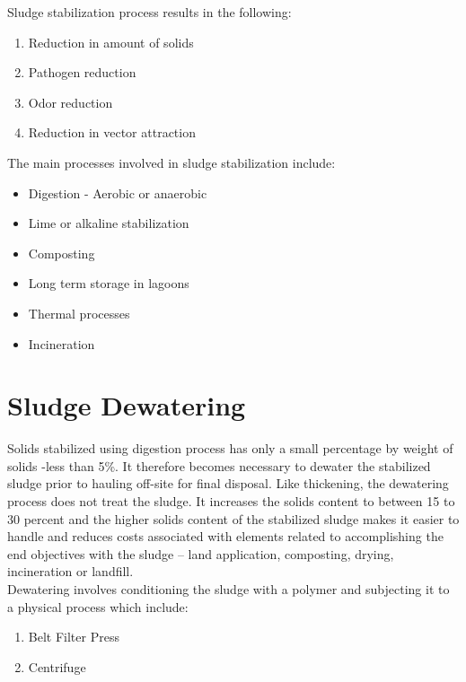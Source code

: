 Sludge stabilization process results in the following:
\begin{enumerate}
\item Reduction in amount of solids
\item Pathogen reduction
\item Odor reduction
\item Reduction in vector attraction
\end{enumerate}
The main processes involved in sludge stabilization include:
\begin{itemize}
\item Digestion - Aerobic or anaerobic
\item Lime or alkaline stabilization
\item Composting
\item Long term storage in lagoons
\item Thermal processes
\item Incineration
\end{itemize}

\section{Sludge Dewatering}
Solids stabilized using digestion process has only a small percentage by weight of solids -less than 5\%.  It therefore becomes necessary to dewater the stabilized sludge prior to hauling off-site for final disposal.  Like thickening, the dewatering process does not treat the sludge.  It increases the solids content to between 15 to 30 percent and the higher solids content of the stabilized sludge makes it easier to handle and reduces costs associated with elements related to accomplishing the end objectives with the sludge – land application, composting, drying, incineration or landfill.\\
Dewatering involves conditioning the sludge with a polymer and subjecting it to a physical process which include:
\begin{enumerate}
\item Belt Filter Press 
\item Centrifuge
\end{enumerate}